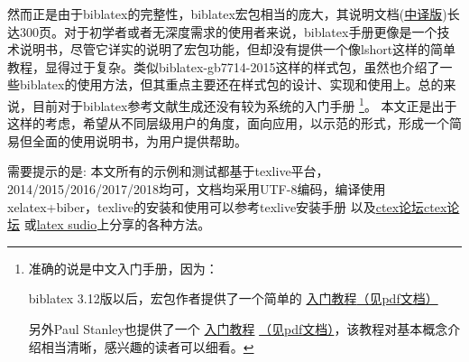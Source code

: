 \documentclass[twoside]{article} %
\begin{document}
然而正是由于biblatex的完整性，biblatex宏包相当的庞大，其说明文档(\href{https://github.com/hushidong/biblatex-zh-cn}{中译版})长达300页。对于初学者或者无深度需求的使用者来说，biblatex手册更像是一个技术说明书，尽管它详实的说明了宏包功能，但却没有提供一个像lshort这样的简单教程，显得过于复杂。类似biblatex-gb7714-2015这样的样式包\cite{胡振震2016}，虽然也介绍了一些biblatex的使用方法，但其重点主要还在样式包的设计、实现和使用上。总的来说，目前对于biblatex参考文献生成还没有较为系统的入门手册
\footnote{准确的说是中文入门手册，因为：\par
biblatex 3.12版以后，宏包作者提供了一个简单的
\href{https://github.com/plk/biblatex/blob/dev/doc/latex/biblatex/biblatex-quickstart.tex}{入门教程}\href{run:exampleandimage/biblatex-quickstart.pdf}{（见pdf文档）}\par
另外Paul Stanley也提供了一个
\href{https://github.com/PaulStanley/biblatex-tutorial}{入门教程}
\href{https://github.com/hushidong/biblatex-tutorial-cn}{（见pdf文档）}，该教程对基本概念介绍相当清晰，感兴趣的读者可以细看。}。
本文正是出于这样的考虑，希望从不同层级用户的角度，面向应用，以示范的形式，形成一个简易但全面的使用说明书，为用户提供帮助。


需要提示的是: 本文所有的示例和测试都基于texlive平台，2014/2015/2016/2017/2018均可，文档均采用UTF-8编码，编译使用xelatex+biber，texlive的安装和使用可以参考texlive安装手册\cite{Berry2016--}
以及\href{http://bbs.ctex.org/forum.php}{ctex论坛ctex论坛}
或\href{http://www.latexstudio.net/}{latex sudio}上分享的各种方法。
\end{document}
